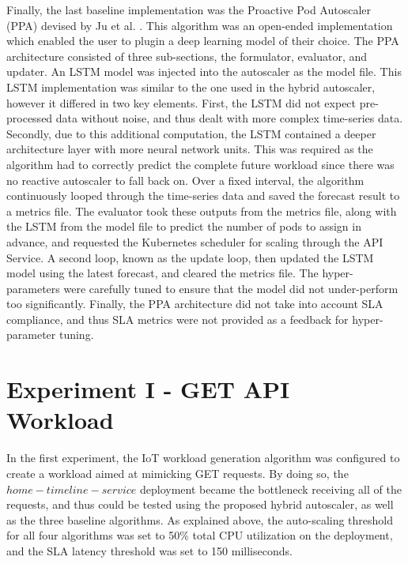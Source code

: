 Finally, the last baseline implementation was the Proactive Pod Autoscaler (PPA) devised by Ju et al. \cite{ju2021proactive}. This algorithm was an open-ended implementation which enabled the user to plugin a deep learning model of their choice. The PPA architecture consisted of three sub-sections, the formulator, evaluator, and updater. An LSTM model was injected into the autoscaler as the model file. This LSTM implementation was similar to the one used in the hybrid autoscaler, however it differed in two key elements. First, the LSTM did not expect pre-processed data without noise, and thus dealt with more complex time-series data. Secondly, due to this additional computation, the LSTM contained a deeper architecture layer with more neural network units. This was required as the algorithm had to correctly predict the complete future workload since there was no reactive autoscaler to fall back on. Over a fixed interval, the algorithm continuously looped through the time-series data and saved the forecast result to a metrics file. The evaluator took these outputs from the metrics file, along with the LSTM from the model file to predict the number of pods to assign in advance, and requested the Kubernetes scheduler for scaling through the API Service. A second loop, known as the update loop, then updated the LSTM model using the latest forecast, and cleared the metrics file. The hyper-parameters were carefully tuned to ensure that the model did not under-perform too significantly. Finally, the PPA architecture did not take into account SLA compliance, and thus SLA metrics were not provided as a feedback for hyper-parameter tuning.\par


\section{Experiment I - GET API Workload}
\label{sec:ch5-exp1-get-api}

In the first experiment, the IoT workload generation algorithm was configured to create a workload aimed at mimicking GET requests. By doing so, the $home-timeline-service$ deployment became the bottleneck receiving all of the requests, and thus could be tested using the proposed hybrid autoscaler, as well as the three baseline algorithms. As explained above, the auto-scaling threshold for all four algorithms was set to 50\% total CPU utilization on the deployment, and the SLA latency threshold was set to 150 milliseconds.\par

